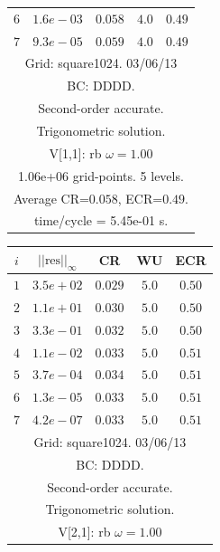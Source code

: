 \begin{table}[hbt]
\begin{center}
{\begin{tabular}{|c|c|c|c|c|}
 $ 6$  & $ 1.6e-03$ & $0.058$ & $ 4.0$ & $0.49$ \\ 
 $ 7$  & $ 9.3e-05$ & $0.059$ & $ 4.0$ & $0.49$ \\ 
\hline 
\multicolumn{5}{|c|}{Grid: square1024. 03/06/13}  \\
\multicolumn{5}{|c|}{BC: DDDD.}  \\
\multicolumn{5}{|c|}{Second-order accurate.}  \\
\multicolumn{5}{|c|}{Trigonometric solution.}  \\
\multicolumn{5}{|c|}{V[1,1]: rb $\omega=1.00$}  \\
\multicolumn{5}{|c|}{1.06e+06 grid-points. 5 levels.}  \\
\multicolumn{5}{|c|}{Average CR=$0.058$, ECR=$0.49$.}  \\
\multicolumn{5}{|c|}{time/cycle = 5.45e-01 s.}  \\
\hline 
\end{tabular}
\begin{tabular}{|c|c|c|c|c|} \hline 
 $i$   & $\vert\vert\mbox{res}\vert\vert_\infty$  &  CR     &  WU    & ECR  \\   \hline 
 $ 1$  & $ 3.5e+02$ & $0.029$ & $ 5.0$ & $0.50$ \\ 
 $ 2$  & $ 1.1e+01$ & $0.030$ & $ 5.0$ & $0.50$ \\ 
 $ 3$  & $ 3.3e-01$ & $0.032$ & $ 5.0$ & $0.50$ \\ 
 $ 4$  & $ 1.1e-02$ & $0.033$ & $ 5.0$ & $0.51$ \\ 
 $ 5$  & $ 3.7e-04$ & $0.034$ & $ 5.0$ & $0.51$ \\ 
 $ 6$  & $ 1.3e-05$ & $0.033$ & $ 5.0$ & $0.51$ \\ 
 $ 7$  & $ 4.2e-07$ & $0.033$ & $ 5.0$ & $0.51$ \\ 
\hline 
\multicolumn{5}{|c|}{Grid: square1024. 03/06/13}  \\
\multicolumn{5}{|c|}{BC: DDDD.}  \\
\multicolumn{5}{|c|}{Second-order accurate.}  \\
\multicolumn{5}{|c|}{Trigonometric solution.}  \\
\multicolumn{5}{|c|}{V[2,1]: rb $\omega=1.00$}  \\

\end{tabular}}
\end{center}
\end{table}
